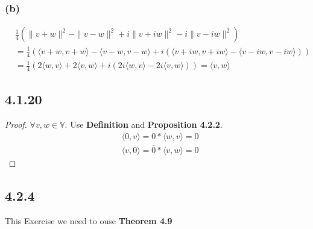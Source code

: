 \documentclass{article}
\newtheorem*{proof}{Proof}
\begin{document}
\subsubsection*{(b)}
\begin{equation*}
    \begin{split}
        &\frac 1 4 (\|v + w\|^2 - \|v - w\|^2 + i\|v + iw\|^2 - i\|v-iw\|^2) \\
        &= \frac 1 4 (\langle v+w, v+w\rangle - \langle v-w, v-w \rangle + i(\langle v+ iw, v+ iw\rangle - \langle v- iw, v- iw \rangle)) \\
        &= \frac 1 4(2 \langle w , v\rangle +2 \langle v, w \rangle + i(2i \langle w , v\rangle - 2i \langle v, w \rangle)) = \langle v, w \rangle
    \end{split}
\end{equation*}

\subsection*{4.1.20}
\begin{proof}
    $\forall v, w \in \mathbb{V}$. Use \textbf{Definition} and \textbf{Proposition 4.2.2}.
    \begin{equation*}
        \begin{split}
            & \langle 0, v \rangle = 0 * \langle w, v \rangle = 0 \\
            & \langle v, 0 \rangle = \overline 0 * \langle v, w \rangle = 0
        \end{split}
    \end{equation*}
\end{proof}

\subsection*{4.2.4}
\noindent This Exercise we need to ouse \textbf{Theorem 4.9} 
\end{document}

